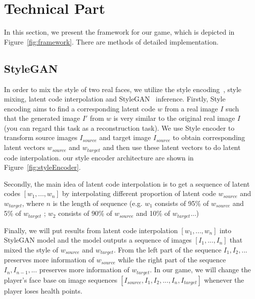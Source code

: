 \section{Technical Part}

% 
In this section, we present the framework for our game, which is depicted in Figure~\ref{fig:framework}. There are methods of detailed implementation.

\subsection{StyleGAN} \label{StyleGAN}
In order to mix the style of two real faces, we utilize the style encoding~\cite{richardson2021encoding}, style mixing, latent code interpolation and StyleGAN~\cite{karras2019style} \cite{karras2020analyzing} inference. Firstly, Style encoding aims to find a corresponding latent code $w$ from a real image $I$ such that the generated image $I'$ from $w$ is very similar to the original real image $I$ (you can regard this task as a reconstruction task). We use Style encoder to transform source images $I_{source}$ and target image $I_{source}$ to obtain corresponding latent vectors $w_{source}$ and $w_{target}$ and then use these latent vectors to do latent code interpolation.
our style encoder architecture are shown in Figure~\ref{fig:styleEncoder}.



Secondly, the main idea of latent code interpolation is to get a sequence of latent codes $[w_1,...,w_n]$ by interpolating different proportion of latent code $w_{source}$ and $w_{target}$, where $n$ is the length of sequence (e.g. $w_1$ consists of 95\% of $w_{source}$ and 5\% of $w_{target}$ ; $w_2$ consists of 90\% of $w_{source}$ and 10\% of $w_{target}$...)

Finally, we will put results from latent code interpolation $[w_1,...,w_n]$ into StyleGAN model and the model outputs a sequence of images $[I_1,...,I_n]$ that mixed the style of $w_{source}$ and $w_{target}$. From the left part of the sequence $I_1,I_2,...$ preserves more information of $w_{source}$ while the right part of the sequence $I_n,I_{n-1},...$ preserves more information of $w_{target}$. In our game, we will change the player's face base on image sequences $[I_{source},I_1,I_2, ... ,I_n,I_{target}]$ whenever the player loses health points. 

